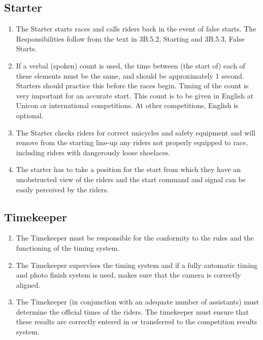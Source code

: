 \subsection{Starter}
	\begin{enumerate}[leftmargin=1.5em,labelsep=*]
		\item The Starter starts races and calls riders back in the event of false starts.
		The Responsibilities follow from the text in 3B.5.2, Starting and 3B.5.3, False Starts.
		\item If a verbal (spoken) count is used, the time between (the start of) each of these elements must be the same, and should be approximately 1 second.
		Starters should practice this before the races begin.
		Timing of the count is very important for an accurate start.
		This count is to be given in English at Unicon or international competitions.
		At other competitions, English is optional.
		\item The Starter checks riders for correct unicycles and safety equipment and will remove from the starting line-up 
        any riders not properly equipped to race, including riders with dangerously loose shoelaces.
		\item The starter has to take a position for the start from which they have an unobstructed view of the riders and 
        the start command and signal can be easily perceived by the riders.
	\end{enumerate}

\subsection{Timekeeper}
	\begin{enumerate}[leftmargin=1.5em,labelsep=*]
		\item The Timekeeper must be responsible for the conformity to the rules and the functioning of the timing system.
		\item The Timekeeper supervises the timing system and if a fully automatic timing and photo finish system is used, makes sure that the camera is correctly aligned.
		\item The Timekeeper (in conjunction with an adequate number of assistants) must determine the official times of the riders.
		The timekeeper must ensure that these results are correctly entered in or transferred to the competition results system.
	\end{enumerate}


